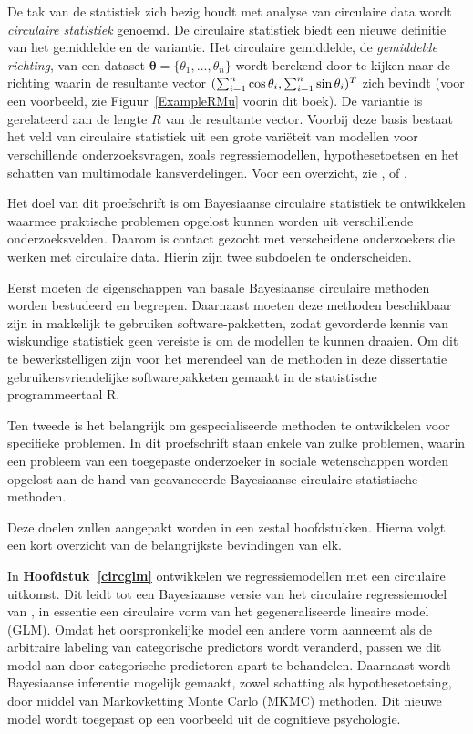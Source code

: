 \documentclass[12pt, a4paper]{book}\usepackage[]{graphicx}\usepackage[]{color}
\let\proglang=\textsf
\begin{document}
De tak van de statistiek zich bezig houdt met analyse van circulaire data wordt \textit{circulaire statistiek} genoemd. De circulaire statistiek biedt een nieuwe definitie van het gemiddelde en de variantie. Het circulaire gemiddelde, de \textit{gemiddelde richting}, van een dataset $\boldsymbol{\theta} = \{\theta_1, \dots, \theta_n\}$ wordt berekend door te kijken naar de richting waarin de resultante vector $(\sum_{i=1}^n\cos\theta_i, \sum_{i=1}^n\sin\theta_i)^T$ zich bevindt (voor een voorbeeld, zie Figuur~\ref{ExampleRMu} voorin dit boek). De variantie is gerelateerd aan de lengte $R$ van de resultante vector. Voorbij deze basis bestaat het veld van circulaire statistiek uit een grote vari\"eteit van modellen voor verschillende onderzoeksvragen, zoals regressiemodellen, hypothesetoetsen en het schatten van multimodale kansverdelingen. Voor een overzicht, zie \citet{fisher1995statistical}, \citet{mardia2009directional} of \citet{pewsey2013circular}.

Het doel van dit proefschrift is om Bayesiaanse circulaire statistiek te ontwikkelen waarmee praktische problemen opgelost kunnen worden uit verschillende onderzoeksvelden. Daarom is contact gezocht met verscheidene onderzoekers die werken met circulaire data. Hierin zijn twee subdoelen te onderscheiden.

Eerst moeten de eigenschappen van basale Bayesiaanse circulaire methoden worden bestudeerd en begrepen. Daarnaast moeten deze methoden beschikbaar zijn in makkelijk te gebruiken software-pakketten, zodat gevorderde  kennis van wiskundige statistiek geen vereiste is om de modellen te kunnen draaien. Om dit te bewerkstelligen zijn voor het merendeel van de methoden in deze dissertatie gebruikersvriendelijke softwarepakketen gemaakt in de statistische programmeertaal \proglang{R}.

Ten tweede is het belangrijk om gespecialiseerde methoden te ontwikkelen voor specifieke problemen. In dit proefschrift staan enkele van zulke problemen, waarin een probleem van een toegepaste onderzoeker in sociale wetenschappen worden opgelost aan de hand van geavanceerde Bayesiaanse circulaire statistische methoden.

Deze doelen zullen aangepakt worden in een zestal hoofdstukken. Hierna volgt een kort overzicht van de belangrijkste bevindingen van elk.

In \textbf{Hoofdstuk~\ref{circglm}} ontwikkelen we regressiemodellen met een circulaire uitkomst. Dit leidt tot een Bayesiaanse versie van het circulaire regressiemodel van \citet{fisher1992regression}, in essentie een circulaire vorm van het gegeneraliseerde lineaire model (GLM). Omdat het oorspronkelijke model een andere vorm aanneemt als de arbitraire labeling van categorische predictors wordt veranderd, passen we dit model aan door categorische predictoren apart te behandelen. Daarnaast wordt Bayesiaanse inferentie mogelijk gemaakt, zowel schatting als hypothesetoetsing, door middel van Markovketting Monte Carlo (MKMC) methoden. Dit nieuwe model wordt toegepast op een voorbeeld uit de cognitieve psychologie.
\end{document}
